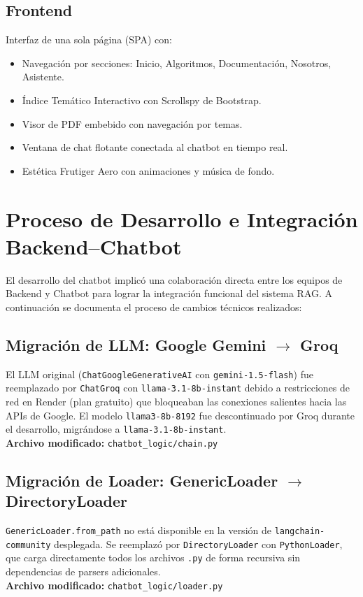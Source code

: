 \documentclass[12pt, letterpaper]{article}
\begin{document}
	\subsection{Frontend}
	Interfaz de una sola página (SPA) con:
	\begin{itemize}[noitemsep]
		\item Navegación por secciones: Inicio, Algoritmos, Documentación, Nosotros, Asistente.
		\item Índice Temático Interactivo con Scrollspy de Bootstrap.
		\item Visor de PDF embebido con navegación por temas.
		\item Ventana de chat flotante conectada al chatbot en tiempo real.
		\item Estética Frutiger Aero con animaciones y música de fondo.
	\end{itemize}
	
	\section{Proceso de Desarrollo e Integración Backend–Chatbot}
	El desarrollo del chatbot implicó una colaboración directa entre los equipos de Backend y Chatbot para lograr la integración funcional del sistema RAG. A continuación se documenta el proceso de cambios técnicos realizados:
	
	\subsection{Migración de LLM: Google Gemini $\to$ Groq}
	El LLM original (\texttt{ChatGoogleGenerativeAI} con \texttt{gemini-1.5-flash}) fue reemplazado por \texttt{ChatGroq} con \texttt{llama-3.1-8b-instant} debido a restricciones de red en Render (plan gratuito) que bloqueaban las conexiones salientes hacia las APIs de Google. El modelo \texttt{llama3-8b-8192} fue descontinuado por Groq durante el desarrollo, migrándose a \texttt{llama-3.1-8b-instant}.\\
	\textbf{Archivo modificado:} \texttt{chatbot\_logic/chain.py}
	
	\subsection{Migración de Loader: GenericLoader $\to$ DirectoryLoader}
	\texttt{GenericLoader.from\_path} no está disponible en la versión de \texttt{langchain-community} desplegada. Se reemplazó por \texttt{DirectoryLoader} con \texttt{PythonLoader}, que carga directamente todos los archivos \texttt{.py} de forma recursiva sin dependencias de parsers adicionales.\\
	\textbf{Archivo modificado:} \texttt{chatbot\_logic/loader.py}
	
\end{document}
